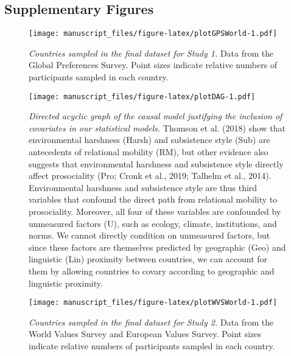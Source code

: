 \documentclass[english,man,floatsintext]{apa6}
\begin{document}
\newpage

\hypertarget{supplementary-figures}{%
\subsection{Supplementary Figures}\label{supplementary-figures}}



\begin{figure}
\centering
\texttt{[image: manuscript\_files/figure-latex/plotGPSWorld-1.pdf]}
\caption{\label{fig:plotGPSWorld}\emph{Countries sampled in the final dataset for Study 1.} Data from the Global Preferences Survey. Point sizes indicate relative numbers of participants sampled in each country.}
\end{figure}

\newpage



\begin{figure}
\centering
\texttt{[image: manuscript\_files/figure-latex/plotDAG-1.pdf]}
\caption{\label{fig:plotDAG}\emph{Directed acyclic graph of the causal model justifying the inclusion of covariates in our statistical models.} Thomson et al. (2018) show that environmental harshness (Harsh) and subsistence style (Sub) are antecedents of relational mobility (RM), but other evidence also suggests that environmental harshness and subsistence style directly affect prosociality (Pro; Cronk et al., 2019; Talhelm et al., 2014). Environmental harshness and subsistence style are thus third variables that confound the direct path from relational mobility to prosociality. Moreover, all four of these variables are confounded by unmeasured factors (U), such as ecology, climate, institutions, and norms. We cannot directly condition on unmeasured factors, but since these factors are themselves predicted by geographic (Geo) and linguistic (Lin) proximity between countries, we can account for them by allowing countries to covary according to geographic and linguistic proximity.}
\end{figure}

\newpage



\begin{figure}
\centering
\texttt{[image: manuscript\_files/figure-latex/plotWVSWorld-1.pdf]}
\caption{\label{fig:plotWVSWorld}\emph{Countries sampled in the final dataset for Study 2.} Data from the World Values Survey and European Values Survey. Point sizes indicate relative numbers of participants sampled in each country.}
\end{figure}
\end{document}
